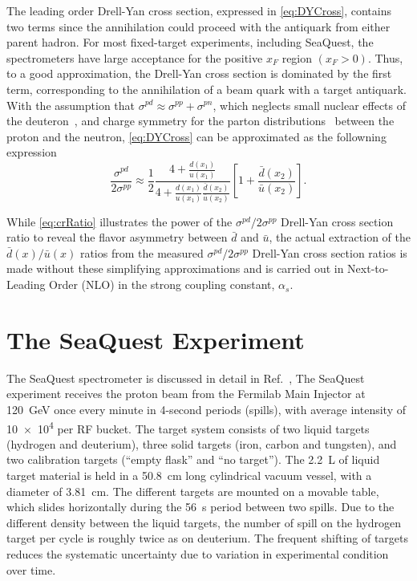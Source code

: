 \documentclass[reprint,aps,unsortedaddress,superscriptaddress,prl,floatfix,showpacs,linenumbers,final]{revtex4-2}
\begin{document}
The leading order Drell-Yan cross section, expressed in \cref{eq:DYCross},
contains two terms since the annihilation could proceed with the antiquark from either parent hadron.
For most fixed-target experiments, including SeaQuest,
the spectrometers have large acceptance for the positive $x_F$  region $\left(x_F > 0\right)$.
Thus, to a good approximation, the Drell-Yan cross section is dominated by the first term,
corresponding to the annihilation of a beam quark with a target antiquark.
With the assumption that $\sigma^{pd} \approx \sigma^{pp} + \sigma^{pn}$,
which neglects small nuclear effects of the deuteron~\cite{kumano1998,ehlers2014},
and charge symmetry for the parton distributions~\cite{londergan2010} between the proton and the neutron,
\cref{eq:DYCross} can be approximated as the followning expression
\begin{equation}
	\frac{\sigma^{pd}}{2\sigma^{pp}} \approx
	\frac{1}{2} \frac{4+\frac{d\left(x_1\right)}{u\left(x_1\right)}}{4+\frac{d\left(x_1\right)}{u\left(x_1\right)}\frac{\bar d\left(x_2\right)}{\bar u\left(x_2\right)}}
	\left[1+\frac{\bar d\left(x_2\right)}{\bar u\left(x_2\right)}\right].
	\label{eq:crRatio}
\end{equation}

While \cref{eq:crRatio} illustrates the power of the $\sigma^{pd}/2\sigma^{pp}$ Drell-Yan cross section
ratio to reveal the flavor asymmetry between $\bar d$ and $\bar u$,
the actual extraction of the $\bar d\left(x\right) / \bar u\left(x\right)$ ratios
from the measured $\sigma^{pd}/ 2 \sigma^{pp}$ Drell-Yan cross section ratios is
made without these simplifying approximations and is carried out in Next-to-Leading Order (NLO)
in the strong coupling constant, $\alpha_s$. %

\section{The SeaQuest Experiment}
\label{sec:seaquest_spectrometer}
The SeaQuest spectrometer is  discussed in detail in Ref.~\cite{aidala2019},
The SeaQuest experiment receives the  proton beam from the Fermilab Main Injector at \SI{120}{\GeV}
once every minute in 4-second periods (spills), with average intensity of \num{10e4} per RF bucket.
The target system consists of two liquid targets (hydrogen and deuterium),
three solid targets (iron, carbon and tungsten), and two calibration targets (``empty flask'' and ``no target'').
The \SI{2.2}{\liter} of liquid target material is held
in a \SI{50.8}{\cm} long cylindrical vacuum vessel, with a diameter of \SI{3.81}{\cm}.
The different targets are mounted on a movable table,
which slides horizontally during the \SI{56}{\s} period between two spills.
Due to the different density between the liquid targets, the number of spill on the
hydrogen target per cycle is roughly twice as on deuterium.
The frequent shifting of targets reduces the systematic uncertainty due to variation in experimental condition over time.
\end{document}
